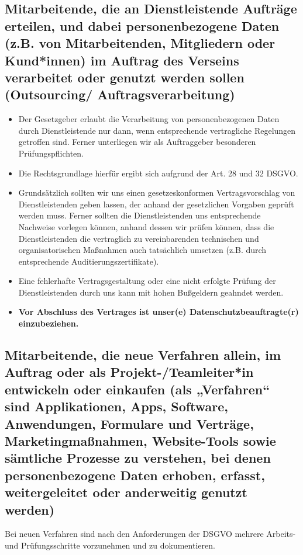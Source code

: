 \documentclass[a4paper, fontsize=11pt]{scrartcl}
\begin{document}
\subsection{Mitarbeitende, die an Dienstleistende Aufträge erteilen, und dabei personenbezogene Daten (z.B. von Mitarbeitenden, Mitgliedern oder Kund*innen) im Auftrag des Verseins verarbeitet oder genutzt werden sollen (Outsourcing/ Auftragsverarbeitung)}
\begin{itemize}
  \item Der Gesetzgeber erlaubt die Verarbeitung von personenbezogenen Daten durch Dienstleistende nur dann, wenn entsprechende vertragliche Regelungen getroffen sind. Ferner unterliegen wir als Auftraggeber besonderen Prüfungspflichten.
  \item Die Rechtsgrundlage hierfür ergibt sich aufgrund der Art. 28 und 32 DSGVO.
  \item Grundsätzlich sollten wir uns einen gesetzeskonformen Vertragsvorschlag von Dienstleistenden geben lassen, der anhand der gesetzlichen Vorgaben geprüft werden muss. Ferner sollten die Dienstleistenden uns entsprechende Nachweise vorlegen können, anhand dessen wir prüfen können, dass die Dienstleistenden die vertraglich zu vereinbarenden technischen und organisatorischen Maßnahmen auch tatsächlich umsetzen (z.B. durch entsprechende Auditierungszertifikate).
  \item Eine fehlerhafte Vertragsgestaltung oder eine nicht erfolgte Prüfung der Dienstleistenden durch uns kann mit hohen Bußgeldern geahndet werden.
  \item \textbf{Vor Abschluss des Vertrages ist unser(e) Datenschutzbeauftragte(r) einzubeziehen.}
\end{itemize}

\subsection{Mitarbeitende, die neue Verfahren allein, im Auftrag oder als Projekt-/Teamleiter*in entwickeln oder einkaufen (als „Verfahren“ sind Applikationen, Apps, Software, Anwendungen, Formulare und Verträge, Marketingmaßnahmen, Website-Tools sowie sämtliche Prozesse zu verstehen, bei denen personenbezogene Daten erhoben, erfasst, weitergeleitet oder anderweitig genutzt werden)}

Bei neuen Verfahren sind nach den Anforderungen der DSGVO mehrere Arbeits- und Prüfungsschritte vorzunehmen und zu dokumentieren.
\end{document}

